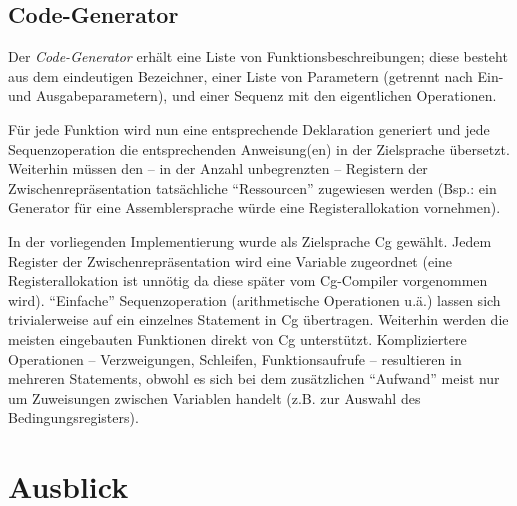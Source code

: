 \documentclass[twoside,a4paper,fleqn,12pt]{article}
\begin{document}
\subsection{Code-Generator}

Der \emph{Code-Generator} erhält eine Liste von Funktionsbeschreibungen; diese besteht aus dem eindeutigen Bezeichner,
einer Liste von Parametern (getrennt nach Ein- und Ausgabeparametern), und einer Sequenz mit den eigentlichen Operationen.

Für jede Funktion wird nun eine entsprechende Deklaration generiert und jede Sequenzoperation die entsprechenden Anweisung(en) in der Zielsprache übersetzt.
Weiterhin müssen den -- in der Anzahl unbegrenzten -- Registern der Zwischenrepräsentation tatsächliche "`Ressourcen"' zugewiesen werden
(Bsp.: ein Generator für eine Assemblersprache würde eine Registerallokation vornehmen).

In der vorliegenden Implementierung wurde als Zielsprache Cg gewählt.
Jedem Register der Zwischenrepräsentation wird eine Variable zugeordnet (eine Registerallokation ist unnötig da diese später vom Cg-Compiler vorgenommen wird).
"`Einfache"' Sequenzoperation (arithmetische Operationen u.ä.) lassen sich trivialerweise auf ein einzelnes Statement in Cg übertragen. 
Weiterhin werden die meisten eingebauten Funktionen direkt von Cg unterstützt. %
Kompliziertere Operationen -- Verzweigungen, Schleifen, Funktionsaufrufe -- resultieren in mehreren Statements, obwohl es sich bei dem
zusätzlichen "`Aufwand"' meist nur um Zuweisungen zwischen Variablen handelt (z.B. zur Auswahl des Bedingungsregisters).


\section{Ausblick}

\cleardoublepage
\appendix

\end{document}
